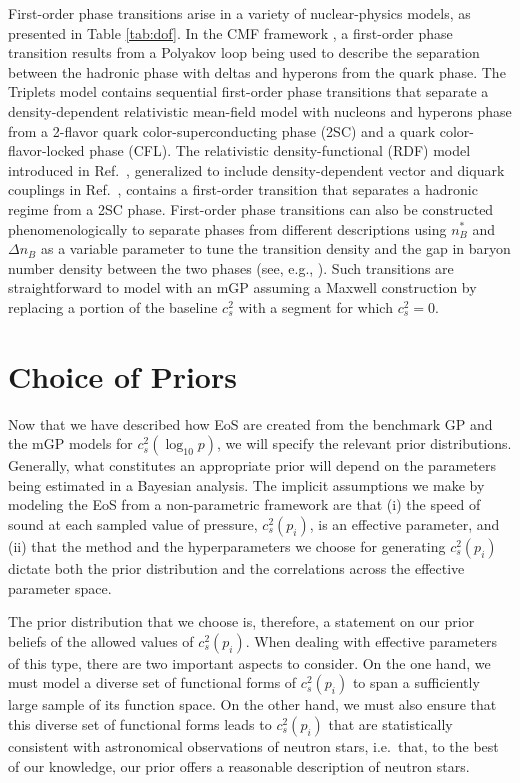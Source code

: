 \documentclass[aps,prd,nofootinbib,tightenlines,notitlepage,floatfix,superscriptaddress,showkeys,twocolumn]{revtex4-1}
\begin{document}
First-order phase transitions arise in a variety of nuclear-physics models, as presented in Table \ref{tab:dof}. In the CMF framework \cite{Dexheimer:2008ax, Dexheimer:2009hi},  a first-order phase transition results from a Polyakov loop being used to describe the separation between the hadronic phase with deltas and hyperons from the quark phase. The Triplets model \cite{Alford:2017qgh} contains sequential first-order phase transitions that separate a density-dependent relativistic mean-field model with nucleons and hyperons phase from a 2-flavor quark color-superconducting phase (2SC) and a quark color-flavor-locked phase (CFL). The relativistic density-functional (RDF) model introduced in Ref.~\cite{Ivanytskyi:2022oxv}, generalized to include density-dependent vector and diquark couplings in Ref.~\cite{Ivanytskyi:2022bjc}, contains a first-order transition that separates a hadronic regime \cite{Shahrbaf:2022upc} from a 2SC phase. First-order phase transitions can also be constructed phenomenologically to separate phases from different descriptions using  $n_B^*$ and $\Delta n_B$ as a variable parameter to tune the transition density and the gap in baryon number density between the two phases (see, e.g., \cite{Mondal:2023gbf,Zhang:2023wqj,Han:2018mtj,Benic:2014jia,Ivanytskyi:2022oxv,Ivanytskyi:2022bjc}). Such transitions are straightforward to model with an mGP assuming a Maxwell construction by replacing a portion of the baseline $c_s^2$ with a segment for which $c_s^2 = 0$.  

\section{Choice of Priors} \label{sec:priors}

Now that we have described how EoS are created from the benchmark GP and the mGP models for $c_s^2(\log_{10} p)$, we will specify the relevant prior distributions.  Generally, what constitutes an appropriate prior will depend on the parameters being estimated in a Bayesian analysis. The implicit assumptions we make by modeling the EoS from a non-parametric framework are that (i) the speed of sound at each sampled value of pressure, $c_s^2(p_i)$, is an effective parameter, and (ii) that the method and the hyperparameters we choose for generating $c_s^2(p_i)$ dictate both the
prior distribution and the correlations across the effective parameter space. 

The prior distribution that we choose is, therefore, a statement on our prior beliefs of the allowed values of $c_s^2(p_i)$. When dealing with effective parameters of this type, there are two important aspects to consider. On the one hand, we must model a diverse set of functional forms of $c_s^2(p_i)$ to span a sufficiently large sample of its function space. On the other hand, we must also ensure that this diverse set of functional forms leads to $c_s^2(p_i)$ that are statistically consistent with astronomical observations of neutron stars, i.e.~that, to the best of our knowledge, our prior offers a reasonable description of neutron stars. 
\end{document}
